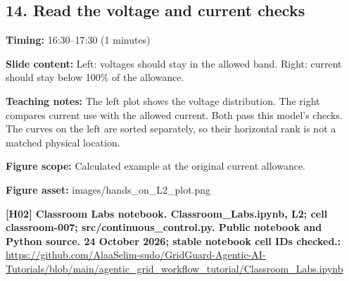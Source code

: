 \documentclass[10pt,letterpaper]{article}
\begin{document}
\subsection*{14. Read the voltage and current checks}
\textbf{Timing:} 16:30--17:30 (1 minutes)\par
\textbf{Slide content:} Left: voltages should stay in the allowed band.
Right: current should stay below 100\% of the allowance.\par
\textbf{Teaching notes:} The left plot shows the voltage distribution. The right compares current use with the allowed current. Both pass this model's checks. The curves on the left are sorted separately, so their horizontal rank is not a matched physical location.\par
\textbf{Figure scope:} Calculated example at the original current allowance.\par
\textbf{Figure asset:} images/hands\_on\_L2\_plot.png\par
\textbf{[H02] Classroom Labs notebook. Classroom\_Labs.ipynb, L2; cell classroom-007; src/continuous\_control.py. Public notebook and Python source. 24 October 2026; stable notebook cell IDs checked.:} \href{https://github.com/AlaaSelim-sudo/GridGuard-Agentic-AI-Tutorials/blob/main/agentic_grid_workflow_tutorial/Classroom_Labs.ipynb}{\small\ttfamily https:/\allowbreak{}/\allowbreak{}github.\allowbreak{}com/\allowbreak{}AlaaSelim-\allowbreak{}sudo/\allowbreak{}GridGuard-\allowbreak{}Agentic-\allowbreak{}AI-\allowbreak{}Tutorials/\allowbreak{}blob/\allowbreak{}main/\allowbreak{}agentic\_\allowbreak{}grid\_\allowbreak{}workflow\_\allowbreak{}tutorial/\allowbreak{}Classroom\_\allowbreak{}Labs.\allowbreak{}ipynb}\par
\par\medskip
\end{document}
